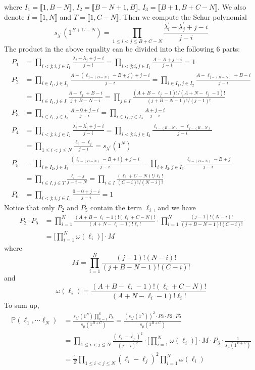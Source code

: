 \documentclass[12pt]{article}
\begin{document}
	where $I_{1}=\llbracket{1,B-N}\rrbracket$, $I_{2}=\llbracket{B-N+1,B}\rrbracket$, $I_{3}=\llbracket{B+1,B+C-N}\rrbracket$. We also denote $I=\llbracket{1,N}\rrbracket$ and $T=\llbracket{1,C-N}\rrbracket$. Then we compute the Schur polynomial $$s_{\lambda^{\prime}}(1^{B+C-N})=\prod_{1\leqslant i<j\leqslant B+C-N}\frac{\lambda^{\prime}_{i}-\lambda_{j}^{\prime}+j-i}{j-i}$$
	The product in the above equality can be divided into the following $6$ parts:
	\begin{align*}
	P_{1} &= \prod_{i<j; i,j\in I_{1}}\frac{\lambda_{i}-\lambda_{j}+j-i}{j-i}=\prod_{i<j; i,j\in I_{1}}\frac{A-A+j-i}{j-i}=1\\
	P_{2} &= \prod_{i\in I_{1},j\in I_{2}}\frac{A-(\ell_{j-(B-N)}-B+j)+j-i}{j-i}=\prod_{i\in I_{1},j\in I_{2}}\frac{A-\ell_{j-(B-N)}+B-i}{j-i}\\ 
	&= \prod_{i\in I_{1},j\in I}\frac{A-\ell_{j}+B-i}{j+B-N-i} = \prod_{j\in I}\frac{(A+B-\ell_{j}-1)!/(A+N-\ell_{j}-1)!}{(j+B-N-1)!/(j-1)!}\\
	P_{3}&=\prod_{i\in I_{1},j\in I_{3}}\frac{A-0+j-i}{j-i}=\prod_{i\in I_{1},j\in I_{3}}\frac{A+j-i}{j-i}\\
	P_{4}&=\prod_{i<j;i,j\in I_{2}}\frac{\lambda^{\prime}_{i}-\lambda_{j}^{\prime}+j-i}{j-i}=\prod_{i<j;i,j\in I_{2}}\frac{\ell_{i-(B-N)}-\ell_{j-(B-N)}}{j-i}\\
	&= \prod_{1\leqslant i<j\leqslant N}\frac{\ell_{i}-\ell_{j}}{j-i}=s_{\lambda^{\ell}}(1^{N})\\
	P_{5}&=\prod_{i\in I_{2},j\in I_{3}}\frac{(\ell_{i-(B-N)}-B+i)+j-i}{j-i}=\prod_{i\in I_{2},j\in I_{3}}\frac{\ell_{i-(B-N)}-B+j}{j-i}\\
	&= \prod_{i\in I,j\in T}\frac{\ell_{i}+j}{j-i+N}=\prod_{i\in I}\frac{(\ell_{i}+C-N)!/\ell_{i}!}{(C-i)!/(N-i)!}\\
	P_{6}&=\prod_{i<j; i,j\in I_{3}}\frac{0-0+j-i}{j-i}=1
	\end{align*}
	Notice that only $P_{2}$ and $P_{5}$ contain the term $\ell_{i}$, and we have 
	\begin{align*}
	P_{2}\cdot P_{5} &= \prod_{i=1}^{N}\frac{(A+B-\ell_{i}-1)!(\ell_{i}+C-N)!}{(A+N-\ell_{i}-1)!\ell_{i}!}\cdot\prod_{i=1}^{N}\frac{(j-1)!(N-i)!}{(j+B-N-1)!(C-i)!}\\
	&=\Big[\prod_{i=1}^{N}\omega(\ell_{i})\Big]\cdot M
	\end{align*} 
	where $$M=\prod_{i=1}^{N}\frac{(j-1)!(N-i)!}{(j+B-N-1)!(C-i)!}$$ and $$\omega(\ell_{i})=\frac{(A+B-\ell_{i}-1)!(\ell_{i}+C-N)!}{(A+N-\ell_{i}-1)!\ell_{i}!}$$
	To sum up,
	\begin{align*}
	\mathbb P(\ell_1,\cdots \ell_N)&=\frac{s_{\lambda^{\ell}}(1^{N})\prod_{k=1}^{6}P_{k}}{s_{\mu}(1^{B+C})}=\frac{(s_{\lambda^{\ell}}(1^{N}))^{2}\cdot P3\cdot P2\cdot P5}{s_{\mu}(1^{B+C})}\\
	&=\prod_{1\leqslant i<j\leqslant N}\frac{(\ell_{i}-\ell_{j})^{2}}{(j-i)^{2}}\cdot\Big[\prod_{i=1}^{N}\omega(\ell_{i})\Big]\cdot M\cdot P_{3}\cdot\frac{1}{s_{\mu}(1^{B+C})}\\
	&=\frac{1}{Z}\prod_{1\leqslant i <j\leqslant N}(\ell_{i}-\ell_{j})^{2}\prod_{i=1}^{N}\omega(\ell_{i})
	\end{align*}
\end{document}

